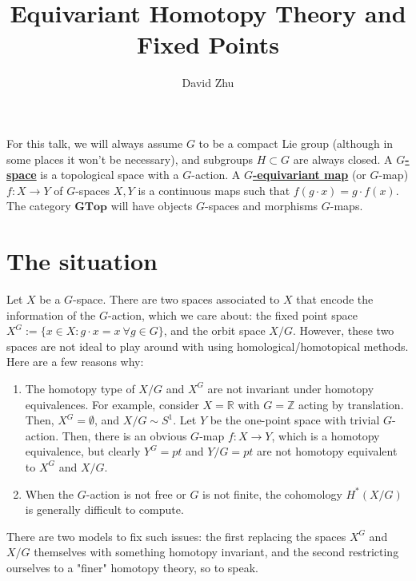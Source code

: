 \documentclass{article}
\title{Equivariant Homotopy Theory and Fixed Points}
\author{David Zhu}
\theoremstyle{definition}
\theoremstyle{definition}
\theoremstyle{definition}
\theoremstyle{definition}
\theoremstyle{definition}
\theoremstyle{definition}
\theoremstyle{definition}
\begin{document}
\maketitle

For this talk, we will always assume $G$ to be a compact Lie group (although in some places it won't be necessary), and subgroups $H\subset G$ are always closed. A \underline{\textbf{$G$-space}} is a topological space with a $G$-action. A \underline{\textbf{$G$-equivariant map}} (or $G$-map) $f:X\to Y$ of $G$-spaces $X,Y$ is a continuous maps such that $f(g\cdot x)=g\cdot f(x)$. The category $\textbf{GTop}$ will have objects $G$-spaces and morphisms $G$-maps. 

\section{The situation}
Let $X$ be a $G$-space. There are two spaces associated to $X$ that encode the information of the $G$-action, which we care about: the fixed point space $X^G:=\{x\in X: g\cdot x=x \ \forall g\in G \}$, and the orbit space $X/G$. However, these two spaces are not ideal to play around with using homological/homotopical methods. Here are a few reasons why:

\begin{enumerate}
    \item The homotopy type of $X/G$ and $X^G$ are not invariant under homotopy equivalences. For example, consider $X=\mathbb{R}$ with $G=\mathbb{Z}$ acting by translation. Then, $X^G=\emptyset$, and $X/G\sim S^1$. Let $Y$ be the one-point space with trivial $G$-action. Then, there is an obvious $G$-map $f: X\to Y$, which is a homotopy equivalence, but clearly $Y^G=pt$ and $Y/G=pt$ are not homotopy equivalent to $X^G$ and $X/G$. 
    \item When the $G$-action is not free or $G$ is not finite, the cohomology $H^*(X/G)$ is generally difficult to compute.

\end{enumerate}
There are two models to fix such issues: the first replacing the spaces $X^G$ and $X/G$ themselves with something homotopy invariant, and the second restricting ourselves to a "finer" homotopy theory, so to speak.
\end{document}
